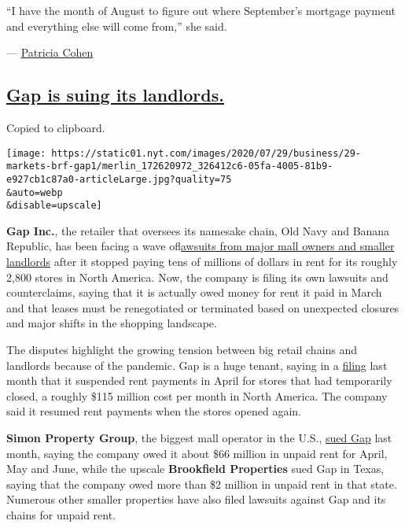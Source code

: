 ``I have the month of August to figure out where September's mortgage
payment and everything else will come from,'' she said.

--- \href{https://www.nytimes.com/by/patricia-cohen}{Patricia Cohen}

\hypertarget{gap-is-suing-its-landlords}{%
\subsection{\texorpdfstring{\protect\hyperlink{gap-is-suing-its-landlords}{Gap
is suing its
landlords.}}{Gap is suing its landlords.}}\label{gap-is-suing-its-landlords}}

Copied to clipboard.

\texttt{[image: https://static01.nyt.com/images/2020/07/29/business/29-markets-brf-gap1/merlin\_172620972\_326412c6-05fa-4005-81b9-e927cb1c87a0-articleLarge.jpg?quality=75\\\&auto=webp\\\&disable=upscale]}

\textbf{Gap Inc.}, the retailer that oversees its namesake chain, Old
Navy and Banana Republic, has been facing a wave
of\href{https://www.nytimes.com/2020/06/05/business/economy/coronavirus-commercial-real-estate.html}{lawsuits
from major mall owners and smaller landlords} after it stopped paying
tens of millions of dollars in rent for its roughly 2,800 stores in
North America. Now, the company is filing its own lawsuits and
counterclaims, saying that it is actually owed money for rent it paid in
March and that leases must be renegotiated or terminated based on
unexpected closures and major shifts in the shopping landscape.

The disputes highlight the growing tension between big retail chains and
landlords because of the pandemic. Gap is a huge tenant, saying in a
\href{http://d18rn0p25nwr6d.cloudfront.net/CIK-0000039911/e24ba13d-fd33-4f86-9dd5-c88ec4ded708.pdf}{filing}
last month that it suspended rent payments in April for stores that had
temporarily closed, a roughly \$115 million cost per month in North
America. The company said it resumed rent payments when the stores
opened again.

\textbf{Simon Property Group}, the biggest mall operator in the U.S.,
\href{https://www.nytimes.com/2020/06/04/business/unemployment-jobless-claims-coronavirus.html}{sued
Gap} last month, saying the company owed it about \$66 million in unpaid
rent for April, May and June, while the upscale \textbf{Brookfield
Properties} sued Gap in Texas, saying that the company owed more than
\$2 million in unpaid rent in that state. Numerous other smaller
properties have also filed lawsuits against Gap and its chains for
unpaid rent.

